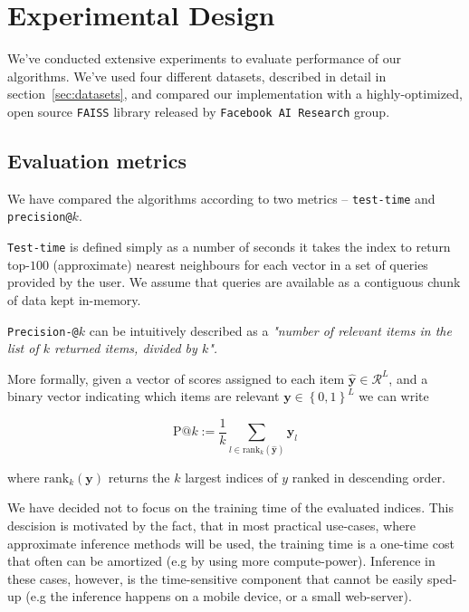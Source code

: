 \section{Experimental Design}

    We've conducted extensive experiments to evaluate performance of our algorithms. We've used
    four different datasets, described in detail in section~\ref{sec:datasets}, and compared
    our implementation with a highly-optimized, open source \texttt{FAISS} library released by
    \texttt{Facebook AI Research} group.

    \subsection{Evaluation metrics}

        We have compared the algorithms according to two metrics -- \texttt{test-time}
        and \texttt{precision@}$k$.

        \texttt{Test-time} is defined simply as a number of seconds it takes the index to return
        top-$100$ (approximate) nearest neighbours for each vector in a set of queries provided by the user.
        We assume that queries are available as a contiguous chunk of data kept in-memory.

        \texttt{Precision-@}$k$ can be intuitively described as a
        \textit{"number of relevant items in the list of $k$ returned items, divided by $k$".}

        More formally, given a vector of scores assigned to each item $\hat{\mathbf y} \in {\mathcal{R}}^{L}$, and a
        binary vector indicating which items are relevant $\mathbf y \in \left\lbrace 0, 1 \right\rbrace^L$
        we can write

        \begin{equation}
            \text{P}@k := \frac{1}{k} \sum_{l\in \text{rank}_k (\hat{\mathbf y})} \mathbf y_l
        \end{equation}

        where $\text{rank}_k(\mathbf y)$ returns the $k$ largest indices of $y$ ranked in descending order.

        We have decided not to focus on the training time of the evaluated indices. This
        descision is motivated by the fact, that in most practical use-cases, where
        approximate inference methods will be used, the training time is a one-time cost that
        often can be amortized (e.g by using more compute-power).
        Inference in these cases, however, is the time-sensitive component
        that cannot be easily sped-up (e.g the inference happens on a mobile device, or a small web-server).

